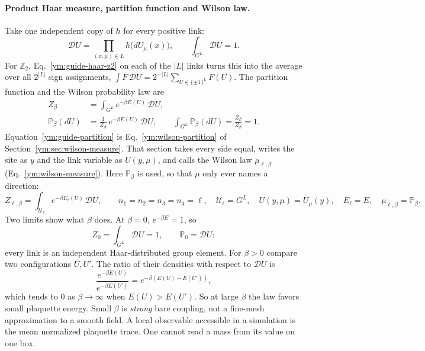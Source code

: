 \paragraph{Product Haar measure, partition function and Wilson law.}
Take one independent copy of $h$ for every positive link:
\begin{equation}\label{ym:guide-product-haar}
 \mathcal DU=\prod_{(x,\mu)\in L}h\big(dU_\mu(x)\big),\qquad
 \int_{G^L}\mathcal DU=1 .
\end{equation}
For $\mathbb Z_2$, Eq.~\eqref{ym:guide-haar-z2} on each of the $|L|$ links
turns this into the average over all $2^{|L|}$ sign assignments,
$\int F\,\mathcal DU=2^{-|L|}\sum_{U\in\{\pm1\}^L}F(U)$. The partition
function and the Wilson probability law are
\begin{align}
 Z_\beta&=\int_{G^L}e^{-\beta E(U)}\,\mathcal DU,\label{ym:guide-partition}\\
 \mathbb P_\beta(dU)&=\frac1{Z_\beta}\,e^{-\beta E(U)}\,\mathcal DU,
 \qquad \int_{G^L}\mathbb P_\beta(dU)=\frac{Z_\beta}{Z_\beta}=1 .
 \label{ym:guide-wilson-law}
\end{align}
Equation~\eqref{ym:guide-partition} is Eq.~\eqref{ym:wilson-partition} of
Section~\ref{ym:sec:wilson-measure}. That section takes every side equal,
writes the site as $y$ and the link variable as $U(y,\mu)$, and calls the
Wilson law $\mu_{\ell,\beta}$ (Eq.~\eqref{ym:wilson-measure}). Here
$\mathbb P_\beta$ is used, so that $\mu$ only ever names a direction:
\begin{equation}\label{ym:guide-partition-lattice}
 Z_{\ell,\beta}=\int_{\mathcal U_\ell}e^{-\beta E_\ell(U)}\,\mathcal DU,
 \qquad n_1=n_2=n_3=n_4=\ell,\quad
 \mathcal U_\ell=G^L,\quad U(y,\mu)=U_\mu(y),\quad E_\ell=E,\quad
 \mu_{\ell,\beta}=\mathbb P_\beta .
\end{equation}
Two limits show what $\beta$ does. At $\beta=0$, $e^{-\beta E}=1$, so
\begin{equation}\label{ym:guide-beta-zero}
 Z_0=\int_{G^L}\mathcal DU=1,\qquad \mathbb P_0=\mathcal DU :
\end{equation}
every link is an independent Haar-distributed group element. For $\beta>0$
compare two configurations $U,U'$. The ratio of their densities
with respect to $\mathcal DU$ is
\begin{equation}\label{ym:guide-density-ratio}
 \frac{e^{-\beta E(U)}}{e^{-\beta E(U')}}=e^{-\beta(E(U)-E(U'))},
\end{equation}
which tends to $0$ as $\beta\to\infty$ when $E(U)>E(U')$. So at large
$\beta$ the law favors small plaquette energy. Small $\beta$ is \emph{strong} bare coupling, not a fine-mesh approximation
to a smooth field. A local observable accessible in a simulation is the mean
normalized plaquette trace. One cannot read a mass from its value on one box.


